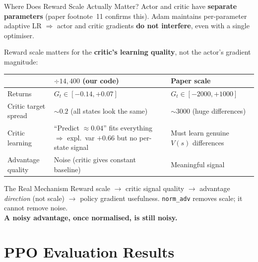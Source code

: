 \documentclass[aspectratio=169,11pt]{beamer}
\begin{document}
\begin{frame}{Where Does Reward Scale Actually Matter?}
  \small
  Actor and critic have \textbf{separate parameters} (paper footnote~11 confirms this).
  Adam maintains per-parameter adaptive LR $\Rightarrow$ actor and critic gradients
  \textbf{do not interfere}, even with a single optimiser.

  \medskip
  Reward scale matters for the \textbf{critic's learning quality}, not the actor's gradient magnitude:

  \medskip
  \begin{center}
  \footnotesize
  \begin{tabular}{lp{4.5cm}p{4.5cm}}
    \toprule
    & \textbf{$\div 14{,}400$ (our code)} & \textbf{Paper scale} \\
    \midrule
    Returns & $G_t \in [-0.14, +0.07]$ & $G_t \in [-2000, +1000]$ \\
    Critic target spread & $\sim 0.2$ (all states look the same) & $\sim 3000$ (huge differences) \\
    Critic learning & ``Predict $\approx 0.04$'' fits everything $\Rightarrow$ expl.\ var $+0.66$ but \alert{no per-state signal} & Must learn genuine $V(s)$ differences \\
    Advantage quality & Noise (critic gives constant baseline) & Meaningful signal \\
    \bottomrule
  \end{tabular}
  \end{center}

  \medskip
  \begin{block}{The Real Mechanism}
    Reward scale $\to$ critic signal quality $\to$ advantage \emph{direction} (not scale)
    $\to$ policy gradient usefulness.  \texttt{norm\_adv} removes scale; it cannot remove noise.\\
    \textbf{A noisy advantage, once normalised, is still noisy.}
  \end{block}
\end{frame}

\section{PPO Evaluation Results}
\end{document}
